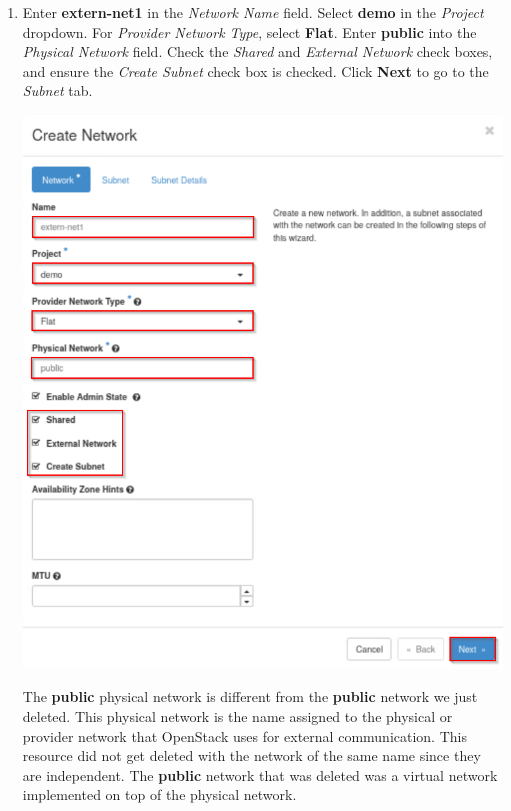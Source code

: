 \documentclass[letterpaper, 12pt]{article}
\begin{document}
\begin{enumerate}
    \item Enter \textbf{extern-net1} in the \textit{Network Name} field.
    Select \textbf{demo} in the \textit{Project} dropdown.
    For \textit{Provider Network Type}, select \textbf{Flat}.
    Enter \textbf{public} into the \textit{Physical Network} field.
    Check the \textit{Shared} and \textit{External Network} check boxes, and ensure the \textit{Create Subnet} check box is checked.
    Click \textbf{Next} to go to the \textit{Subnet} tab.

    \begin{center}
        \includegraphics[width=\linewidth]{images/part1/step7.png}
    \end{center}

    \begin{notebox}
        The \textbf{public} physical network is different from the \textbf{public} network we just deleted.
        This physical network is the name assigned to the physical or provider network that OpenStack uses for external communication.
        This resource did not get deleted with the network of the same name since they are independent.
        The \textbf{public} network that was deleted was a virtual network implemented on top of the physical network.
    \end{notebox}


\end{enumerate}
\end{document}
